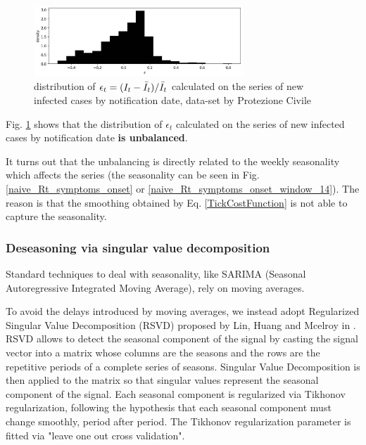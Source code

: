\documentclass[graybox]{svmult}
\begin{document}
\begin{figure}[t]
\center
\includegraphics[width=0.7\textwidth]{Rt_images/epsilon_tikhonov_distribution.jpg}
\caption{distribution of $\epsilon_t = (I_t - \Bar{I}_t)/\Bar{I}_t$ calculated on the series of new infected cases by notification date, data-set by Protezione Civile}
\label{epsilon_tikhonov_distribution}
\end{figure}

Fig. \ref{epsilon_tikhonov_distribution} shows that the distribution of $\epsilon_t$ calculated on the series of new infected cases by notification date \textbf{is unbalanced}.

It turns out that the unbalancing is directly related to the weekly seasonality which affects the series (the seasonality can be seen in Fig. \ref{naive_Rt_symptoms_onset} or \ref{naive_Rt_symptoms_onset_window_14}). The reason is that the smoothing obtained by Eq. \ref{TickCostFunction} is not able to capture the seasonality. 

\subsubsection{Deseasoning via singular value decomposition}
\label{RSVD}

Standard techniques to deal with seasonality, like SARIMA (Seasonal Autoregressive Integrated Moving Average), rely on moving averages. 

To avoid the delays introduced by moving averages, we instead adopt 
Regularized Singular Value Decomposition (RSVD) proposed by Lin, Huang and Mcelroy in \cite{LinHuangMcelroy}. RSVD allows to detect the seasonal component of the signal by casting the signal vector into a matrix whose columns are the seasons and the rows are the repetitive periods of a complete series of seasons. Singular Value Decomposition is then applied to the matrix so that singular values represent the seasonal component of the signal. Each seasonal component is regularized via Tikhonov regularization, following the hypothesis that each seasonal component must change smoothly, period after period. The Tikhonov regularization parameter is fitted via "leave one out cross validation".
\end{document}
